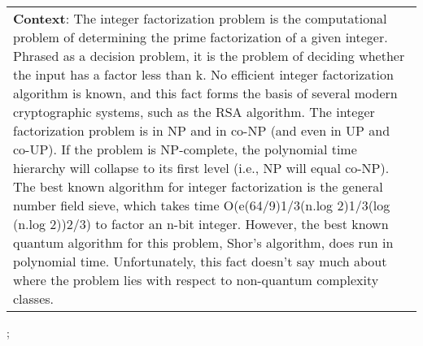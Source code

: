 \begin{figure*}[ht]
{\begin{tabular}{p{}}
            \textbf{Context}: The integer factorization problem is the computational problem of determining the prime factorization of a given integer. Phrased as a decision problem, it is the problem of deciding whether the input has a factor less than k. No efficient integer factorization algorithm is known, and this fact forms the basis of several modern cryptographic systems, such as the RSA algorithm. The integer factorization problem is in NP and in co-NP (and even in UP and co-UP). If the problem is NP-complete, the polynomial time hierarchy will collapse to its first level (i.e., NP will equal co-NP). The best known algorithm for integer factorization is the general number field sieve, which takes time O(e(64/9)1/3(n.log 2)1/3(log (n.log 2))2/3) to factor an n-bit integer. However, the best known quantum algorithm for this problem, Shor's algorithm, does run in polynomial time. Unfortunately, this fact doesn't say much about where the problem lies with respect to non-quantum complexity classes. \\
        \end{tabular}
    };
    \label{fig:ex-56e1ec83cd28a01900c67c0c}
\end{figure*}


